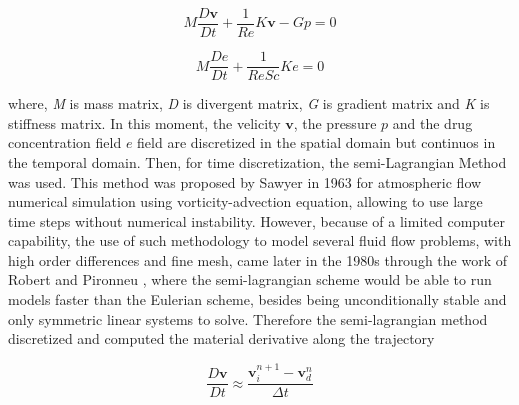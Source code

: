 \documentclass[10pt,fleqn,a4paper,twoside]{article}
\begin{document}
\vspace{-0.65cm}
\begin{equation}
 M \frac{D \textbf{v}}{Dt} 
 + \frac{1}{\textit{Re}} K \textbf{v}
 - Gp
 = 0 \label{vorticity matrix}
\end{equation}

\vspace{-0.65cm}
\begin{equation}
 M \frac{De}{Dt} 
 + \frac{1}{\textit{ReSc}} K e
 = 0 \label{concentration matrix}
\end{equation}



\noindent
where,
\textit{M} is mass matrix,
\textit{D} is divergent matrix,
\textit{G} is gradient matrix and
\textit{K} is stiffness matrix.
In this moment, 
the velicity $\textbf{v}$,
the pressure $p$ and
the drug concentration field $e$ field
are discretized in the spatial domain but
continuos in the temporal domain.
Then, for time discretization, the semi-Lagrangian Method was used. 
This method was proposed by Sawyer in 1963 \cite{sawyer1963} for atmospheric flow numerical simulation using vorticity-advection equation, allowing to use large time steps without numerical instability. 
However, because of a limited computer capability, the use of such methodology to model several fluid flow problems, with high order differences and fine mesh, came later in the 1980s through the work of Robert \cite{robert1981} and Pironneu \cite{pironneau1982}, where the semi-lagrangian scheme would be able to run models faster than the Eulerian scheme, besides being unconditionally stable and only symmetric linear systems to solve. 
Therefore the semi-lagrangian method discretized and 
computed the material derivative along the trajectory 


\vspace{-0.4cm}
\begin{equation}
 \frac{D \textbf{v}}{D t} \approx
 \frac{\textbf{v}_{i}^{n+1} - \textbf{v}_{d}^{n}}{\Delta t}
\end{equation}
\end{document}
